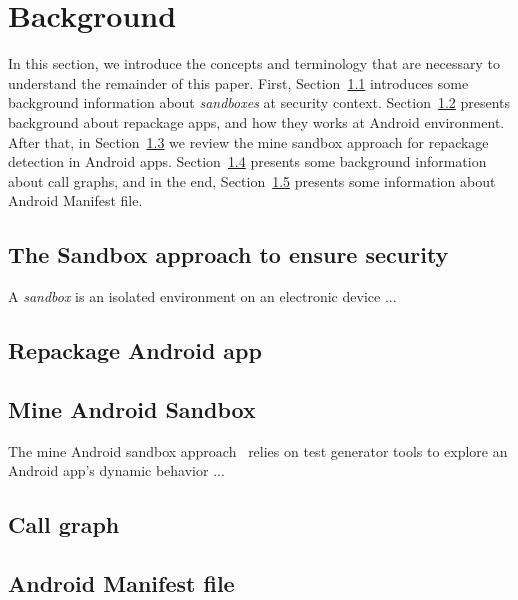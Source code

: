 \section{Background}\label{sec:background}

In this section, we introduce the concepts and terminology that are necessary to understand the remainder of this paper. First, Section~\ref{sec:sand} introduces some background information about \emph{sandboxes} at security context. Section~\ref{sec:repackage} presents background about repackage apps, and how they works at Android environment.
After that, in Section~\ref{sec:android-sandbox} we review the mine sandbox approach for repackage detection in Android apps. Section~\ref{sec:cg} presents some background information about call graphs, and in the end, Section~\ref{sec:mf} presents some
information about Android Manifest file.

\subsection{The Sandbox approach to ensure security}\label{sec:sand}

A \emph{sandbox} is an isolated environment on an electronic device ...

\subsection{Repackage Android app}\label{sec:repackage}

\subsection{Mine Android Sandbox}\label{sec:android-sandbox}

The mine Android sandbox approach~\cite{DBLP:conf/icse/JamrozikSZ16} relies on test generator tools to explore an Android app's dynamic behavior ...

\subsection{Call graph}\label{sec:cg}

\subsection{Android Manifest file}\label{sec:mf}